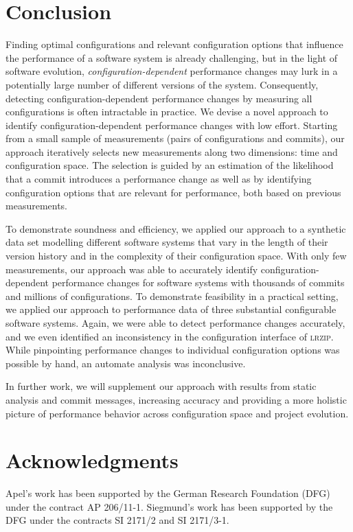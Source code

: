 \documentclass[sigconf, screen]{acmart}
\begin{document}
	\section{Conclusion}
	Finding optimal configurations and relevant configuration options that influence the performance of a software system is already challenging, but in the light of software evolution, \emph{configuration-dependent} performance changes may lurk in a potentially large number of different versions of the system.
	Consequently, detecting configuration-dependent performance changes by measuring all configurations is often intractable in practice. We devise a novel approach to identify config\-uration-dependent performance changes with low effort. Starting from a small sample of measurements (pairs of configurations and commits), our approach iteratively selects new measurements along two dimensions: time and
	configuration space. The selection is guided by an
	estimation of the likelihood that a commit introduces a performance change as well as by identifying configuration options that are relevant for performance, both based on previous measurements.
	
	To demonstrate soundness and efficiency, we applied our approach to a synthetic data set modelling different software systems that vary in the length of their version history and in the complexity of  their configuration space. With only few measurements, our approach was able to accurately
	identify configuration-dependent performance changes for software
	systems with thousands of commits and millions of configurations. 
	To demonstrate feasibility in a practical setting, we
	applied our approach to performance data of three substantial configurable
	software systems. Again, we were able to detect performance
	changes accurately, and we even identified an inconsistency in the configuration
	interface of \textsc{lrzip}. While pinpointing performance changes to individual configuration options was possible by hand, an automate analysis was inconclusive. 
	
	In further work, we will supplement our approach with results from static analysis and commit messages, increasing accuracy and providing a more holistic picture of performance behavior across configuration space and project evolution.
	
	\section{Acknowledgments}
	Apel’s work has been supported by the German Research Foundation (DFG) under the contract AP 206/11-1. Siegmund’s work has been supported by the DFG under the
	contracts SI 2171/2 and SI 2171/3-1.
	
	\clearpage
	
	
	
	\clearpage
	
	
\end{document}
